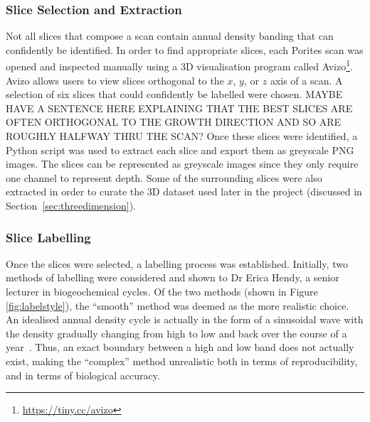 \subsubsection{Slice Selection and Extraction}

Not all slices that compose a scan contain annual density banding that can confidently be identified. In order to find appropriate slices, each Porites scan was opened and inspected manually using a 3D visualisation program called Avizo\footnote{\url{https://tiny.cc/avizo}}. Avizo allows users to view slices orthogonal to the $x$, $y$, or $z$ axis of a scan. A selection of six slices that could confidently be labelled were chosen. MAYBE HAVE A SENTENCE HERE EXPLAINING THAT THE BEST SLICES ARE OFTEN ORTHOGONAL TO THE GROWTH DIRECTION AND SO ARE ROUGHLY HALFWAY THRU THE SCAN? Once these slices were identified, a Python script was used to extract each slice and export them as greyscale PNG images. The slices can be represented as greyscale images since they only require one channel to represent depth. Some of the surrounding slices were also extracted in order to curate the 3D dataset used later in the project (discussed in Section~\ref{sec:threedimension}).

\subsubsection{Slice Labelling}

Once the slices were selected, a labelling process was established. Initially, two methods of labelling were considered and shown to Dr Erica Hendy, a senior lecturer in biogeochemical cycles. Of the two methods (shown in Figure \ref{fig:labelstyle}), the ``smooth'' method was deemed as the more realistic choice. An idealised annual density cycle is actually in the form of a sinusoidal wave with the density gradually changing from high to low and back over the course of a year~\cite[p. 39]{coralsine}. Thus, an exact boundary between a high and low band does not actually exist, making the ``complex'' method unrealistic both in terms of reproducibility, and in terms of biological accuracy.


